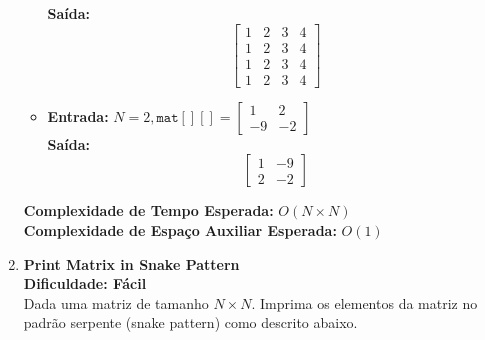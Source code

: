 \documentclass[a4paper,12pt]{article}
\begin{document}
\begin{enumerate}
\begin{itemize}
        \textbf{Saída:} 
        \[
        \begin{bmatrix}
            1 & 2 & 3 & 4\\
            1 & 2 & 3 & 4\\
            1 & 2 & 3 & 4\\
            1 & 2 & 3 & 4
        \end{bmatrix}
        \] 
        
        \item \textbf{Entrada:} \( N = 2, \texttt{mat}[][] = \begin{bmatrix}1 & 2\\-9 & -2\end{bmatrix} \) \\
        \textbf{Saída:} 
        \[\begin{bmatrix}
            1 & -9\\
            2 & -2
        \end{bmatrix}\]
    \end{itemize}
    
    \textbf{Complexidade de Tempo Esperada:} \( O(N \times N) \) \\
    \textbf{Complexidade de Espaço Auxiliar Esperada:} \( O(1) \)

    \pagebreak

    \item \textbf{Print Matrix in Snake Pattern} \\
    \textbf{Dificuldade: Fácil} \\
    Dada uma matriz de tamanho \( N \times N \). Imprima os elementos da matriz no padrão serpente (snake pattern) como descrito abaixo.

    \begin{figure}[!ht]
        \centering
\end{figure}
\end{enumerate}
\end{document}
